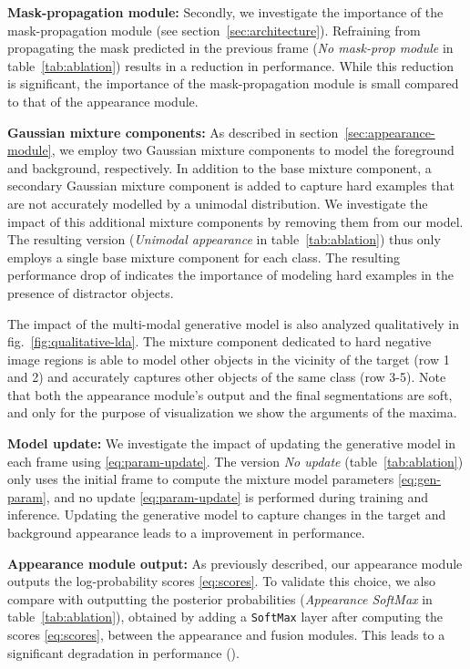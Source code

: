 \documentclass[10pt,twocolumn,letterpaper]{article}
\newcommand{\parsection}[1]{\noindent\textbf{#1:} }
\begin{document}
\parsection{Mask-propagation module}
Secondly, we investigate the importance of the mask-propagation module (see section~\ref{sec:architecture}). 
Refraining from propagating the mask predicted in the previous frame (\emph{No mask-prop module} in table~\ref{tab:ablation}) results in a  reduction in performance. While this reduction is significant, the importance of the mask-propagation module is small compared to that of the appearance module.

\parsection{Gaussian mixture components}
As described in section~\ref{sec:appearance-module}, we employ two Gaussian mixture components to model the foreground and background, respectively. In addition to the base mixture component, a secondary Gaussian mixture component is added to capture hard examples that are not accurately modelled by a unimodal distribution. We investigate the impact of this additional mixture components by removing them from our model. The resulting version (\emph{Unimodal appearance} in table~\ref{tab:ablation}) thus only employs a single base mixture component for each class. The resulting performance drop of  indicates the importance of modeling hard examples in the presence of distractor objects. 

The impact of the multi-modal generative model is also analyzed qualitatively in fig.~\ref{fig:qualitative-lda}. The mixture component dedicated to hard negative image regions is able to model other objects in the vicinity of the target (row 1 and 2) and accurately captures other objects of the same class (row 3-5). Note that both the appearance module's output and the final segmentations are soft, and only for the purpose of visualization we show the arguments of the maxima.

\parsection{Model update}
We investigate the impact of updating the generative model in each frame using \eqref{eq:param-update}. The version \emph{No update} (table~\ref{tab:ablation}) only uses the initial frame to compute the mixture model parameters \eqref{eq:gen-param}, and no update \eqref{eq:param-update} is performed during training and inference. Updating the generative model to capture changes in the target and background appearance leads to a  improvement in performance.

\parsection{Appearance module output}
As previously described, our appearance module outputs the log-probability scores \eqref{eq:scores}. To validate this choice, we also compare with outputting the posterior probabilities (\emph{Appearance SoftMax} in table~\ref{tab:ablation}), obtained by adding a \verb|SoftMax| layer after computing the scores \eqref{eq:scores}, between the appearance and fusion modules. This leads to a significant degradation in performance ().
\end{document}
